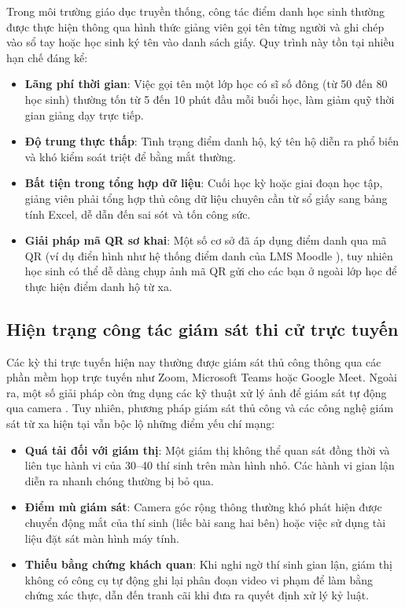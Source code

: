 \documentclass[../DoAn.tex]{subfiles}
\begin{document}
Trong môi trường giáo dục truyền thống, công tác điểm danh học sinh thường được thực hiện thông qua hình thức giảng viên gọi tên từng người và ghi chép vào sổ tay hoặc học sinh ký tên vào danh sách giấy. Quy trình này tồn tại nhiều hạn chế đáng kể:
\begin{itemize}
    \item \textbf{Lãng phí thời gian}: Việc gọi tên một lớp học có sĩ số đông (từ 50 đến 80 học sinh) thường tốn từ 5 đến 10 phút đầu mỗi buổi học, làm giảm quỹ thời gian giảng dạy trực tiếp.
    \item \textbf{Độ trung thực thấp}: Tình trạng điểm danh hộ, ký tên hộ diễn ra phổ biến và khó kiểm soát triệt để bằng mắt thường.
    \item \textbf{Bất tiện trong tổng hợp dữ liệu}: Cuối học kỳ hoặc giai đoạn học tập, giảng viên phải tổng hợp thủ công dữ liệu chuyên cần từ sổ giấy sang bảng tính Excel, dễ dẫn đến sai sót và tốn công sức.
    \item \textbf{Giải pháp mã QR sơ khai}: Một số cơ sở đã áp dụng điểm danh qua mã QR (ví dụ điển hình như hệ thống điểm danh của LMS Moodle \cite{moodle_attendance_plugin}), tuy nhiên học sinh có thể dễ dàng chụp ảnh mã QR gửi cho các bạn ở ngoài lớp học để thực hiện điểm danh hộ từ xa.
\end{itemize}

\subsection{Hiện trạng công tác giám sát thi cử trực tuyến}

\label{subsection:2.1.2}

Các kỳ thi trực tuyến hiện nay thường được giám sát thủ công thông qua các phần mềm họp trực tuyến như Zoom, Microsoft Teams hoặc Google Meet. Ngoài ra, một số giải pháp còn ứng dụng các kỹ thuật xử lý ảnh để giám sát tự động qua camera \cite{kaundinya2026inbrowser}. Tuy nhiên, phương pháp giám sát thủ công và các công nghệ giám sát từ xa hiện tại vẫn bộc lộ những điểm yếu chí mạng:
\begin{itemize}
    \item \textbf{Quá tải đối với giám thị}: Một giám thị không thể quan sát đồng thời và liên tục hành vi của 30--40 thí sinh trên màn hình nhỏ. Các hành vi gian lận diễn ra nhanh chóng thường bị bỏ qua.
    \item \textbf{Điểm mù giám sát}: Camera góc rộng thông thường khó phát hiện được chuyển động mắt của thí sinh (liếc bài sang hai bên) hoặc việc sử dụng tài liệu đặt sát màn hình máy tính.
    \item \textbf{Thiếu bằng chứng khách quan}: Khi nghi ngờ thí sinh gian lận, giám thị không có công cụ tự động ghi lại phân đoạn video vi phạm để làm bằng chứng xác thực, dẫn đến tranh cãi khi đưa ra quyết định xử lý kỷ luật.
\end{itemize}
\end{document}
